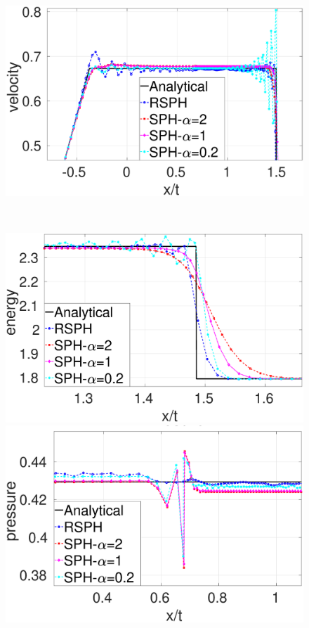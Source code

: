 \begin{figure}
\begin{minipage}{.495\textwidth}
    \end{minipage}%
    \begin{minipage}{.495 \textwidth}
        \centering
        \includegraphics[width=0.99 \textwidth]{Chapter-4/Figures/Sod/RCM-Sod-SPH-alf-v-zoom}
    \end{minipage}%
    \\
    \begin{minipage}{.495 \textwidth}
        \centering
        \includegraphics[width=0.99 \textwidth]{Chapter-4/Figures/Sod/RCM-Sod-SPH-alf-e-zoom}
    \end{minipage}%
    \begin{minipage}{.495\textwidth}
        \centering
        \includegraphics[width=0.99 \textwidth]{Chapter-4/Figures/Sod/RCM-Sod-SPH-alf-p-zoom}

\end{minipage}
\end{figure}
